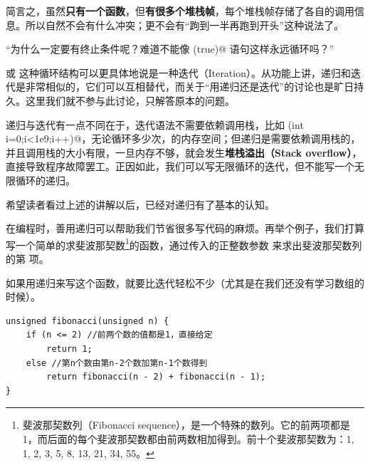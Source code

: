 简言之，虽然\textbf{只有一个函数}，但\textbf{有很多个堆栈帧}，每个堆栈帧存储了各自的调用信息。所以自然不会有什么冲突；更不会有``跔到一半再跑到开头''这种说法了。\par
{\kaishu ``为什么一定要有终止条件呢？难道不能像 \lstinline@while(true)@ 语句这样永远循环吗？''}\par
\lstinline@for@ 或 \lstinline@while@ 这种循环结构可以更具体地说是一种迭代（Iteration）。从功能上讲，递归和迭代是非常相似的，它们可以互相替代，而关于``用递归还是迭代''的讨论也是旷日持久。这里我们就不参与此讨论，只解答原本的问题。\par
递归与迭代有一点不同在于，迭代语法不需要依赖调用栈，比如 \lstinline@for(int i=0;i<1e9;i++)@，无论循环多少次， \lstinline@int@ 的内存空间；但递归是需要依赖调用栈的，并且调用栈的大小有限，一旦内存不够，就会发生\textbf{堆栈溢出（Stack overflow）}，直接导致程序故障罢工。正因如此，我们可以写无限循环的迭代，但不能写一个无限循环的递归。\par
希望读者看过上述的讲解以后，已经对递归有了基本的认知。\par
在编程时，善用递归可以帮助我们节省很多写代码的麻烦。再举个例子，我们打算写一个简单的求斐波那契数\footnote{斐波那契数列（Fibonacci sequence），是一个特殊的数列。它的前两项都是1，而后面的每个斐波那契数都由前两数相加得到。前十个斐波那契数为：1, 1, 2, 3, 5, 8, 13, 21, 34, 55。}的函数，通过传入的正整数参数 \lstinline@n@ 来求出斐波那契数列的第 \lstinline@n@ 项。\par
如果用递归来写这个函数，就要比迭代轻松不少（尤其是在我们还没有学习数组的时候）。\par
\begin{lstlisting}
unsigned fibonacci(unsigned n) {
    if (n <= 2) //前两个数的值都是1，直接给定
        return 1;
    else //第n个数由第n-2个数加第n-1个数得到
        return fibonacci(n - 2) + fibonacci(n - 1);
}
\end{lstlisting}\par
